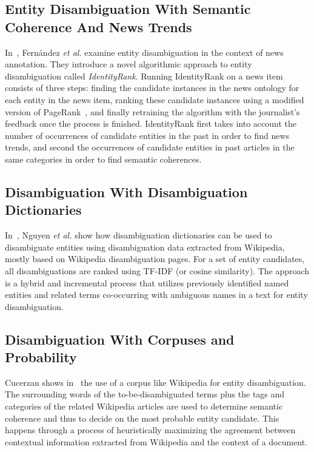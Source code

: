 \documentclass[twocolumn]{article}
\begin{document}
\subsection{Entity Disambiguation With Semantic Coherence And News Trends}
In~\cite{Fernandez:IdentityRank}, Fern\'{a}ndez \emph{et al.} examine entity disambiguation in the context of news annotation.
They introduce a novel algorithmic approach to entity disambiguation called \textit{IdentityRank}. Running IdentityRank
on a news item consists of three steps: finding the candidate instances in the news ontology for each entity in the
news item, ranking these candidate instances using a modified version of PageRank~\cite{Brin:PageRank}, and finally
retraining the algorithm with the journalist's feedback once the process is finished. IdentityRank first takes into
account the number of occurrences of candidate entities in the past in order to find news trends, and second the
occurrences of candidate entities in past articles in the same categories in order to find semantic coherences.

\subsection{Disambiguation With Disambiguation Dictionaries}
In~\cite{Nguyen:NamedEntity}, Nguyen \emph{et al.} show how disambiguation dictionaries can be used to disambiguate entities
using disambiguation data extracted from Wikipedia, mostly based on Wikipedia 
disambiguation pages. For a set of entity 
candidates, all disambiguations are ranked using TF-IDF (or cosine similarity). The approach is a hybrid and incremental process that utilizes previously identified named
entities and related terms co-occurring with ambiguous names in a text for entity disambiguation.

\subsection{Disambiguation With Corpuses and Probability}
Cucerzan shows in~\cite{Cucerzan:Wikipedia} the use of a corpus like Wikipedia for entity disambiguation. The
surrounding words of the to-be-disambiguated terms plus the tags and categories of the related Wikipedia articles are
 used to determine semantic coherence and thus to decide on the most probable entity candidate. This happens
through a process of heuristically maximizing the agreement between contextual information extracted from Wikipedia and
the context of a document.
\end{document}
